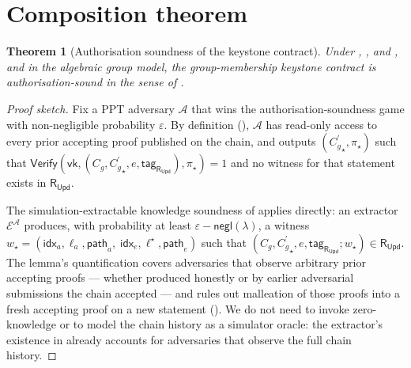 \documentclass[11pt,a4paper]{article}
\theoremstyle{plain}
\newtheorem{theorem}{Theorem}
\theoremstyle{definition}
\newcommand{\Cg}{C_g}
\newcommand{\Cgp}{{C_g^{\prime}}}
\newcommand{\RUpd}{\mathsf{R}_{\mathsf{Upd}}}
\newcommand{\negl}{\mathsf{negl}}
\newcommand{\Adv}{\mathcal{A}}
\newcommand{\Verify}{\mathsf{Verify}}
\newcommand{\Idx}{\mathsf{idx}}
\newcommand{\Pth}{\mathsf{path}}
\begin{document}
\section{Composition theorem}
\label{sec:theorem}

\begin{theorem}[Authorisation soundness of the keystone contract]
\label{thm:auth}
Under , , and , and
in the algebraic group model, the group-membership keystone
contract is authorisation-sound in the sense of .
\end{theorem}

\begin{proof}[Proof sketch]
Fix a PPT adversary $\Adv$ that wins the
authorisation-soundness game with non-negligible probability
$\varepsilon$. By definition (), $\Adv$ has
read-only access to every prior accepting proof published on
the chain, and outputs $(\Cgp_{\star}, \pi_{\star})$ such that
$\Verify(\mathsf{vk},
(\Cg, \Cgp_{\star}, e, \mathsf{tag}_{\RUpd}), \pi_{\star}) = 1$
and no witness for that statement exists in
$\RUpd$.

The simulation-extractable knowledge soundness of
 applies directly: an extractor
$\mathcal{E}^{\Adv}$ produces, with probability at least
$\varepsilon - \negl(\lambda)$, a witness
$w_{\star} = (\Idx_a, \ell_a, \Pth_a,\; \Idx_e, \ell^{\star},
\Pth_e)$ such that
$(\Cg, \Cgp_{\star}, e, \mathsf{tag}_{\RUpd}; w_{\star})
\in \RUpd$. The lemma's quantification covers
adversaries that observe arbitrary prior accepting proofs ---
whether produced honestly or by earlier adversarial submissions
the chain accepted --- and rules out malleation of those proofs
into a fresh accepting proof on a new statement
(). We do not need to invoke zero-knowledge
or to model the chain history as a simulator oracle: the
extractor's existence in  already accounts
for adversaries that observe the full chain history.


\end{proof}
\end{document}
